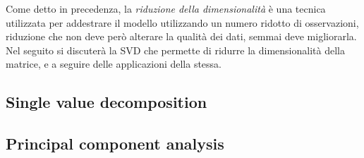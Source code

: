 \documentclass{subfiles}
\begin{document}
\label{sec:4}
Come detto in precedenza, la \emph{riduzione della dimensionalità} è una tecnica utilizzata per addestrare il modello utilizzando un numero ridotto di osservazioni,
riduzione che non deve però alterare la qualità dei dati, semmai deve migliorarla.
Nel seguito si discuterà la SVD che permette di ridurre la dimensionalità della matrice, e a seguire delle applicazioni della stessa.

\subsection{Single value decomposition}


\subsection{Principal component analysis}

\end{document}
